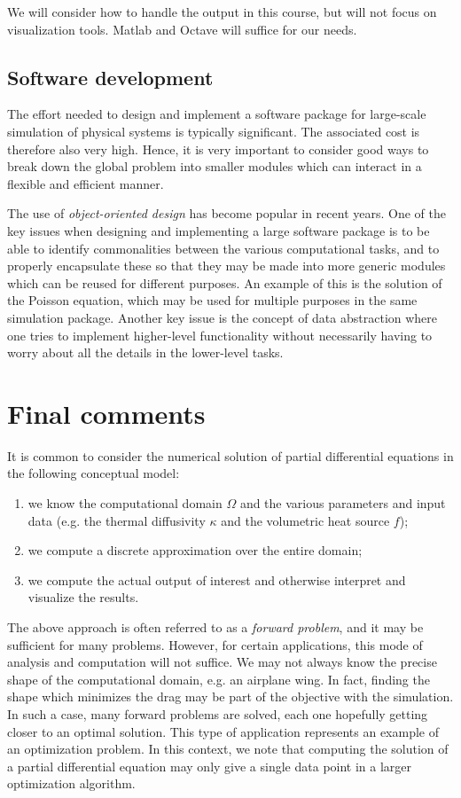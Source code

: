 We will consider how to handle the output in this course, but will not focus on
visualization tools. Matlab and Octave will suffice for our needs.

\subsection{Software development}

The effort needed to design and implement a software package for large-scale
simulation of physical systems is typically significant. The associated cost is
therefore also very high. Hence, it is very important to consider good ways to
break down the global problem into smaller modules which can interact in a
flexible and efficient manner.

The use of \emph{object-oriented design} has become popular in recent years. One
of the key issues when designing and implementing a large software package is to
be able to identify commonalities between the various computational tasks, and
to properly encapsulate these so that they may be made into more generic modules
which can be reused for different purposes. An example of this is the solution
of the Poisson equation, which may be used for multiple purposes in the same
simulation package. Another key issue is the concept of data abstraction where
one tries to implement higher-level functionality without necessarily having to
worry about all the details in the lower-level tasks.

\section{Final comments}

It is common to consider the numerical solution of partial differential
equations in the following conceptual model:
\begin{enumerate}
\item we know the computational domain $\Omega$ and the various parameters and
  input data (e.g. the thermal diffusivity $\kappa$ and the volumetric heat
  source $f$);
\item we compute a discrete approximation over the entire domain;
\item we compute the actual output of interest and otherwise interpret and
  visualize the results.
\end{enumerate}

The above approach is often referred to as a \emph{forward problem}, and it may
be sufficient for many problems. However, for certain applications, this mode of
analysis and computation will not suffice. We may not always know the precise
shape of the computational domain, e.g. an airplane wing. In fact, finding the
shape which minimizes the drag may be part of the objective with the simulation.
In such a case, many forward problems are solved, each one hopefully getting
closer to an optimal solution. This type of application represents an example of
an optimization problem. In this context, we note that computing the solution of
a partial differential equation may only give a single data point in a larger
optimization algorithm.

